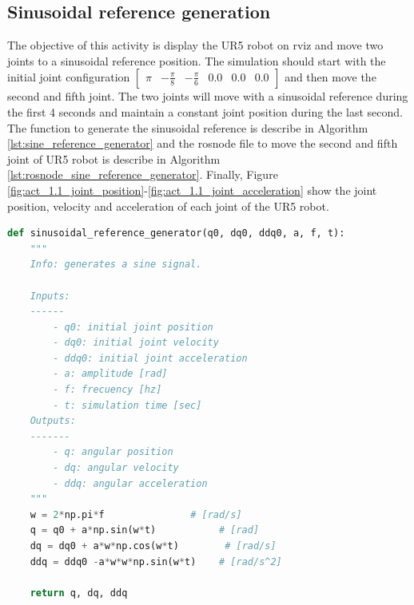 \subsection{Sinusoidal reference generation}
The objective of this activity is display the UR5 robot on rviz and move two joints to a sinusoidal reference position.  The simulation should start with the initial joint configuration $\begin{bmatrix} \pi & -\frac{\pi}{8} & -\frac{\pi}{6} & 0.0 & 0.0 & 0.0 \end{bmatrix}$ and then move the second and fifth joint. The two joints will move with a sinusoidal reference during the first 4 seconds and maintain a constant joint position during the last second. The function to generate the sinusoidal reference is describe in Algorithm \ref{lst:sine_reference_generator} and the rosnode file to move the second and fifth joint of UR5 robot is describe in Algorithm \ref{lst:rosnode_sine_reference_generator}. Finally, Figure \ref{fig:act_1.1_joint_position}-\ref{fig:act_1.1_joint_acceleration} show the joint position, velocity and acceleration of each joint of the UR5 robot.

\begin{lstlisting}[language=Python,caption=Function to generate sinusoidal reference., label={lst:sine_reference_generator}]
    def sinusoidal_reference_generator(q0, dq0, ddq0, a, f, t):
    """
    Info: generates a sine signal.

    Inputs: 
    ------
        - q0: initial joint position
        - dq0: initial joint velocity
        - ddq0: initial joint acceleration
        - a: amplitude [rad]
        - f: frecuency [hz]
        - t: simulation time [sec]
    Outputs:
    -------
        - q: angular position
        - dq: angular velocity
        - ddq: angular acceleration
    """
    w = 2*np.pi*f               # [rad/s]
    q = q0 + a*np.sin(w*t)           # [rad]
    dq = dq0 + a*w*np.cos(w*t)        # [rad/s]
    ddq = ddq0 -a*w*w*np.sin(w*t)    # [rad/s^2]

    return q, dq, ddq
\end{lstlisting}

